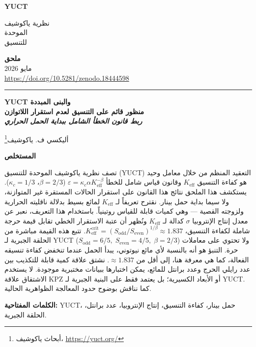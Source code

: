 \documentclass[12pt,a4paper]{article}
\newcommand{\makeheader}{%
	\noindent
	\begin{minipage}{0.17\textwidth}
		\raggedright
		{\sffamily\bfseries\color{skyblue}\fontsize{40}{40}\selectfont YUCT}%
	\end{minipage}%
	\hspace{30pt}
	\begin{minipage}{0.32\textwidth}
		\raggedright
		{\sffamily\fontsize{11}{13}\selectfont نظرية ياكوشيف\\ الموحدة\\ للتنسيق}%
	\end{minipage}%
	\hfill
	\begin{minipage}{0.38\textwidth}
		\raggedleft
		{\sffamily\bfseries ملحق}\\
		{\sffamily مايو 2026}\\
		{\sffamily\footnotesize \scriptsize\url{https://doi.org/10.5281/zenodo.18444598}}%
	\end{minipage}
	\par\vspace{5pt}
	\noindent\textcolor{gold}{\rule{\textwidth}{1.6pt}}
	\par\vspace{0pt}
}
\begin{document}
	\thispagestyle{firstpage}
	\makeheader
	
	\vspace{0cm}
	{\LARGE\bfseries YUCT والبنى المبددة \\ 
		\Large منظور قائم على التنسيق لعدم استقرار اللاتوازن \\[0.3cm]
		\large \textit{ربط قانون الخطأ الشامل ببداية الحمل الحراري} \par}
	\vspace{0.2cm}
	
	{\large أليكسي ف. ياكوشيف\footnote{أبحاث ياكوشيف، \url{https://yuct.org/}}} \\
	\vspace{0.0cm}
	
	{\color{darkblue}\textbf{\LARGE المستخلص}} \par
	{\large
		\noindent
		تصف نظرية ياكوشيف الموحدة للتنسيق (YUCT) التعقيد المنظم من خلال معامل وحيد هو كفاءة التنسيق \(K_{\mathrm{eff}}\) وقانون قياس شامل للخطأ \(\varepsilon = \kappa_c\alpha K_{\mathrm{eff}}^{-\beta}\) (\(\beta = 2/3\)، \(\kappa_c = 1/3\)). يستكشف هذا الملحق نتائج هذا القانون على استقرار الحالات المستقرة غير المتوازنة، ولا سيما بداية حمل بينار. نقترح تعريفاً لـ \(K_{\mathrm{eff}}\) لمائع بسيط بدلالة ناقليته الحرارية ولزوجته القصية — وهي كميات قابلة للقياس روتينياً. باستخدام هذا التعريف، نعبر عن معدل إنتاج الإنتروبيا \(\sigma\) كدالة لـ \(K_{\mathrm{eff}}\) ونُظهر أن عتبة الاستقرار الخطي تقابل قيمة حرجة شاملة لكفاءة التنسيق، \(K_{\mathrm{eff}}^{\mathrm{crit}} = (S_{\mathrm{odd}}/S_{\mathrm{even}})^{1/\beta} \approx 1.837\). تتبع هذه القيمة مباشرة من الحلقة الجبرية لـ YUCT (\(S_{\mathrm{odd}} = 6/5,\; S_{\mathrm{even}} = 4/5,\; \beta = 2/3\)) ولا تحتوي على معاملات حرة. التنبؤ هو أنه بالنسبة لأي مائع نيوتوني، يبدأ الحمل عندما تنخفض كفاءة تنسيقه الفعالة، كما هي معرفة هنا، إلى أقل من $\approx 1.837$. نشتق علاقة كمية قابلة للتكذيب بين عدد رايلي الحرج وعدد برانتل للمائع، يمكن اختبارها ببيانات مختبرية موجودة. لا يستخدم الاشتقاق علاقة KPZ أو الأبعاد الكسيرية؛ بل يعتمد فقط على البنية الجبرية لـ YUCT. كما نناقش بوضوح حدود المعالجة الظواهرية الحالية.
	}
	
	\vspace{0.1cm}
	\noindent
	{\color{darkblue}\textbf{الكلمات المفتاحية:}} YUCT، حمل بينار، كفاءة التنسيق، إنتاج الإنتروبيا، عدد برانتل، الحلقة الجبرية.
	
	\clearpage
	\tableofcontents
	\clearpage
	
\end{document}
